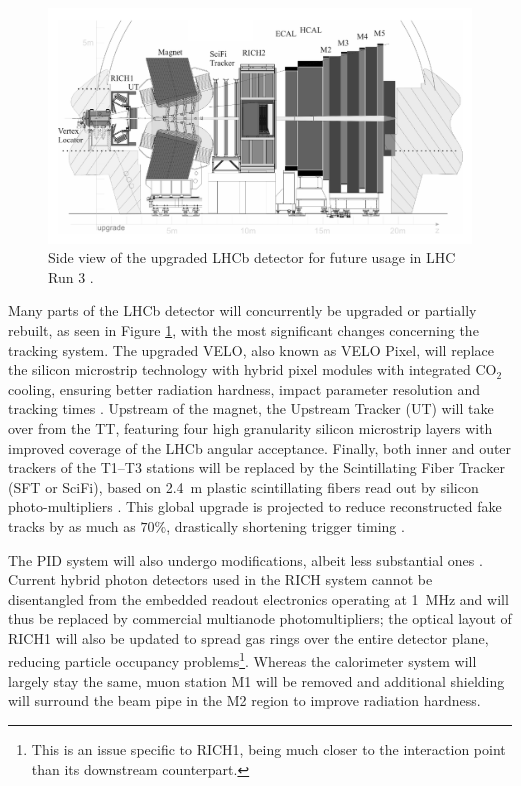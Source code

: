 \begin{figure}[t]
	\centering
	\includegraphics[width=\textwidth]{graphics/02-lhcb/lhcb_diagram_run3.png}
	\caption[LHCb detector side view (Run 3).]{Side view of the upgraded LHCb detector for future usage in LHC Run 3 \cite{Piucci_2017}.}
	\label{fig:2:lhcb_diagram_run3}
\end{figure}

Many parts of the LHCb detector will concurrently be upgraded or partially rebuilt, as seen in Figure \ref{fig:2:lhcb_diagram_run3}, with the most significant changes concerning the tracking system.
The upgraded VELO, also known as VELO Pixel, will replace the silicon microstrip technology with hybrid pixel modules with integrated CO$_2$ cooling, ensuring better radiation hardness, impact parameter resolution and tracking times \cite{Collaboration:1624070}.
Upstream of the magnet, the Upstream Tracker (UT) will take over from the TT, featuring four high granularity silicon microstrip layers with improved coverage of the LHCb angular acceptance. Finally, both inner and outer trackers of the T1--T3 stations will be replaced by the Scintillating Fiber Tracker (SFT or SciFi), based on \SI{2.4}{\meter} plastic scintillating fibers read out by silicon photo-multipliers \cite{Collaboration:1647400}.
This global upgrade is projected to reduce reconstructed fake tracks by as much as $70\%$, drastically shortening trigger timing \cite{Piucci_2017}.

The PID system will also undergo modifications, albeit less substantial ones \cite{Collaboration:1624074}.
Current hybrid photon detectors used in the RICH system cannot be disentangled from the embedded readout electronics operating at \SI{1}{\mega\hertz} and will thus be replaced by commercial multianode photomultipliers;
the optical layout of RICH1 will also be updated to spread gas rings over the entire detector plane, reducing particle occupancy problems\footnote{This is an issue specific to RICH1, being much closer to the interaction point than its downstream counterpart.}.
Whereas the calorimeter system will largely stay the same, muon station M1 will be removed and additional shielding will surround the beam pipe in the M2 region to improve radiation hardness.

